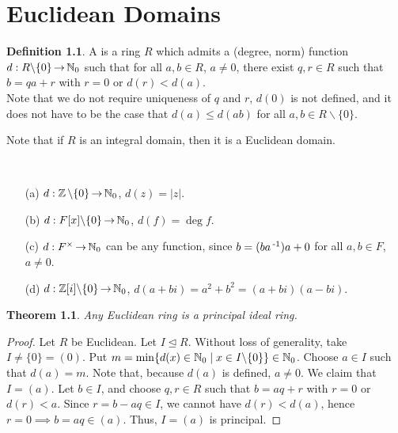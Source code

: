 \documentclass[11pt]{book}
\newcounter{counter}
\newtheorem{theorem}[counter]{Theorem}   \newtheorem*{theorem*}{Theorem}   \newtheorem{lemma}[counter]{Lemma}   \newtheorem{corollary}[counter]{Corollary}
\theoremstyle{definition}   \newtheorem{defn}[counter]{Definition} %
\newcommand{\bs}{\backslash}   \newcommand{\A}{\mathcal{A}}   \newcommand{\sy}{\textnormal{Syl}}   \newcommand{\size}[1]{\left| #1 \right|}
\newcommand{\nsg}{\mathrel{\unlhd}}   \newcommand{\ind}{\parindent24pt}   \newcommand{\vn}{\varnothing}
\DeclareMathOperator{\ra}{\rightarrow}   \DeclareMathOperator{\Poly}{\mathbf{P}}   \DeclareMathOperator{\spn}{\textnormal{span}}   \DeclareMathOperator{\aut}{\textnormal{Aut}}
\newcommand{\vs}{\vspace{8pt}}
\numberwithin{counter}{chapter}
\begin{document}
\chapter{ \null Euclidean Domains}



\begin{defn}
A  is a ring $R$ which admits a (degree, norm) function $d : R\bs\{0\} \ra \N_0$ such that for all $a,b \in R$, $a \ne 0$, there exist $q,r \in R$ such that $b = qa + r$ with $r = 0$ or $d(r) < d(a)$. \\

Note that we do not require uniqueness of $q$ and $r$, $d(0)$ is not defined, and it does not have to be the case that $d(a) \leq d(ab)$ for all $a,b \in R \bs \{0\}$.

Note that if $R$ is an integral domain, then it is a Euclidean domain.
\end{defn}

\vs

\begin{example}
\
\begin{enumerate}
\item[(a)] $d : \z\bs\{0\} \ra \N_0$, $d(z) = |z|$.
\item[(b)] $d : F[x]\bs\{0\} \ra \N_0$, $d(f) = \deg f$.
\item[(c)] $d : F\x \ra \N_0$ can be any function, since $b = (ba\operatorname{^{-1}})a + 0$ for all $a,b \in F$, $a \ne 0$.
\item[(d)] $d : \z[i]\bs\{0\} \ra \N_0$, $d(a+bi) = a^2+b^2 = (a+bi)(a-bi)$.
\end{enumerate}
\end{example}

\vs

\begin{theorem}
Any Euclidean ring is a principal ideal ring.
\end{theorem}

\begin{proof}
Let $R$ be Euclidean. Let $I \nsg R$. Without loss of generality, take $I \ne \{0\} = (0)$. Put $m = \min\{d(x)\in \N_0 \mid x \in I\bs\{0\}\} \in \N_0$. Choose $a \in I$ such that $d(a) = m$. Note that, because $d(a)$ is defined, $a \ne 0$. We claim that $I = (a)$.  Let $b \in I$, and choose $q,r \in R$ such that $b = aq + r$ with $r = 0$ or $d(r) < a$. Since $r = b - aq \in I$, we cannot have $d(r) < d(a)$, hence $r = 0 \implies b = aq \in (a)$. Thus, $I = (a)$ is principal.
\end{proof}
\end{document}
